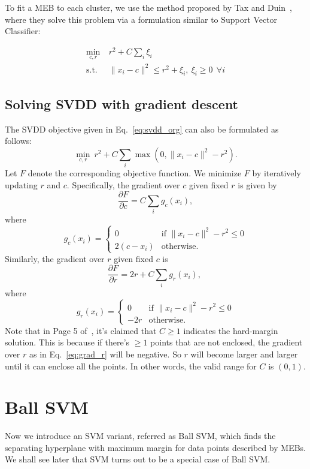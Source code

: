 \documentclass[12pt]{article}
\begin{document}
To fit a MEB to each cluster, we use the method proposed by Tax and Duin~\cite{tax04}, where they solve this problem via a formulation similar to Support Vector Classifier:

\begin{align}
\min_{c,r} ~& r^2 + C\sum_i \xi_i \nonumber\\
\text{s.t.} ~& \| x_i - c \|^2 \le r^2 + \xi_i, ~\xi_i \ge 0~ ~\forall i
\label{eq:svdd_org}
\end{align}

\subsection{Solving SVDD with gradient descent}
The SVDD objective given in Eq.~\ref{eq:svdd_org} can also be formulated as follows:
\begin{equation}
\min_{c,r} ~r^2 + C\sum_i \max(0, \| x_i - c\|^2 - r^2).
\end{equation}
Let $F$ denote the corresponding objective function. We minimize $F$ by iteratively updating $r$ and $c$. Specifically, the gradient over $c$ given fixed $r$ is given by
$$
\frac{\partial F}{\partial c} = C\sum_i g_c(x_i),
$$
where
$$
g_c(x_i) =
  \begin{cases}
   0 & \text{if } \| x_i - c\|^2 - r^2 \le 0  \\
   2(c - x_i) & \text{otherwise}.
  \end{cases}
$$
Similarly, the gradient over $r$ given fixed $c$ is 
$$
\frac{\partial F}{\partial r} = 2r + C\sum_i g_r(x_i),~\label{eq:grad_r}
$$
where
$$
g_r(x_i) =
  \begin{cases}
   0 & \text{if } \| x_i - c\|^2 - r^2 \le 0  \\
   -2r & \text{otherwise}.
  \end{cases}
$$
Note that in Page 5 of~\cite{tax04}, it's claimed that $C \ge 1$ indicates the hard-margin solution. This is because if there's $\ge 1$ points that are not enclosed, the gradient over $r$ as in Eq.~\ref{eq:grad_r} will be negative. So $r$ will become larger and larger until it can enclose all the points. In other words, the valid range for $C$ is $(0, 1)$.

\section{Ball SVM}
Now we introduce an SVM variant, referred as Ball SVM, which finds the separating hyperplane with maximum margin for data points described by MEBs. We shall see later that SVM turns out to be a special case of Ball SVM. 
\end{document}
